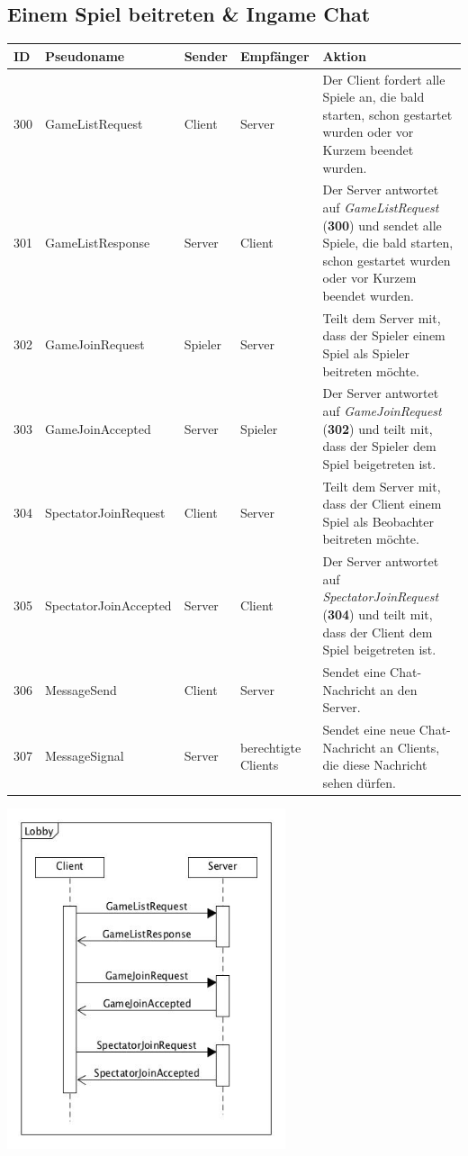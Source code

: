 \documentclass[a4paper, 10pt]{article}
\begin{document}
\subsection{Einem Spiel beitreten \& Ingame Chat}
\begin{center}
	\begin{tabular}{| l | l | p{2.5cm} | p{2.5cm} | p{6cm} |}
		\hline
			ID & Pseudoname & Sender & Empfänger & Aktion \\
		\hline \hline
			300 & GameListRequest & Client & Server &
			Der Client fordert alle Spiele an, die bald starten, schon gestartet wurden oder vor
			Kurzem beendet wurden. \\
		\hline
			301 & GameListResponse & Server & Client &
			Der Server antwortet auf \textit{GameListRequest} (\textbf{300}) und sendet alle Spiele, die bald starten,
			schon gestartet wurden oder vor Kurzem beendet wurden. \\
		\hline
			302 & GameJoinRequest & Spieler & Server &
			Teilt dem Server mit, dass der Spieler einem Spiel als Spieler beitreten möchte. \\
		\hline
			303 & GameJoinAccepted & Server & Spieler &
			Der Server antwortet auf  \textit{GameJoinRequest} (\textbf{302}) und teilt mit, dass der Spieler dem Spiel beigetreten ist. \\
		\hline
			304 & SpectatorJoinRequest & Client & Server &
			Teilt dem Server mit, dass der Client einem Spiel als Beobachter beitreten möchte. \\
		\hline
			305 & SpectatorJoinAccepted & Server & Client &
			Der Server antwortet auf  \textit{SpectatorJoinRequest} (\textbf{304}) und teilt mit, dass der Client dem Spiel beigetreten ist. \\
		\hline
			306 & MessageSend & Client & Server &
			Sendet eine Chat-Nachricht an den Server. \\
		\hline
			307 & MessageSignal & Server & berechtigte Clients &
			Sendet eine neue Chat-Nachricht an Clients, die diese Nachricht sehen dürfen. \\
		\hline
	\end{tabular}

	\includegraphics[height=10cm]{media/SequenceLobby}
\end{center}
\end{document}
